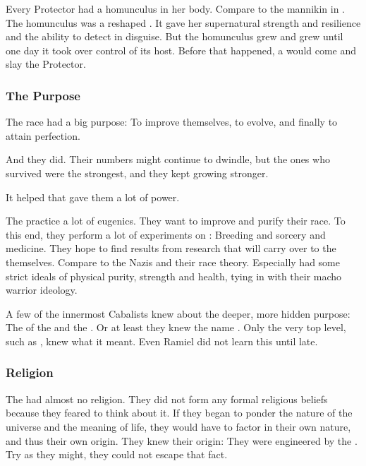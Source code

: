 Every Protector had a homunculus in her body. 
Compare to the mannikin in \cite{RobertBloch:TheMannikin}.
The homunculus was a reshaped .
It gave her supernatural strength and resilience and the ability to detect \mothlain in disguise.
But the homunculus grew and grew until one day it took over control of its host. 
Before that happened, a  would come and slay the Protector.





\subsubsection{The Purpose}
The \resphan{} race had a big purpose: 
To improve themselves, to evolve, and finally to attain perfection. 

And they did. 
Their numbers might continue to dwindle, but the ones who survived were the strongest, and they kept growing stronger. 

It helped that \iquin{} gave them a lot of power. 

The \resphain practice a lot of eugenics.
They want to improve and purify their race. 
To this end, they perform a lot of experiments on \humans:
Breeding and sorcery and medicine. 
They hope to find results from \human research that will carry over to the \resphain themselves. 
Compare to the Nazis and their race theory. 
Especially \Mystraacht had some strict ideals of physical purity, strength and health, tying in with their macho warrior ideology.

A few of the innermost Cabalists knew about the deeper, more hidden purpose: 
The  of the \baneking \Voidbringer and the \noggyal {}.
Or at least they knew the name . 
Only the very top level, such as \Azraid, knew what it meant.
Even Ramiel did not learn this until late. 





\subsubsection{Religion}
The \resphain had almost no religion.
They did not form any formal religious beliefs because they feared to think about it.
If they began to ponder the nature of the universe and the meaning of life, they would have to factor in their own nature, and thus their own origin.
They knew their origin: They were engineered by the \banes.
Try as they might, they could not escape that fact.


